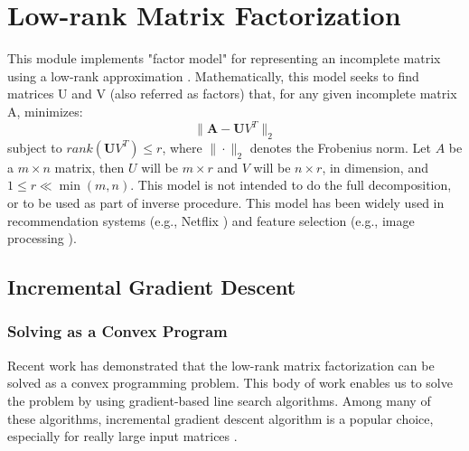 
\chapter{Low-rank Matrix Factorization}

This module implements "factor model" for representing an incomplete matrix using a low-rank approximation \cite{DBLP:conf/icml/SrebroJ03}.
Mathematically, this model seeks to find matrices U and V (also referred as factors) that, for any given incomplete matrix A, minimizes:
\[ \|\boldsymbol A - \boldsymbol UV^{T} \|_2 \]
subject to $rank(\boldsymbol UV^{T}) \leq r$, where $\|\cdot\|_2$ denotes the Frobenius norm.
Let $A$ be a $m \times n$ matrix, then $U$ will be $m \times r$ and $V$ will be $n \times r$, in dimension, and $1 \leq r \ll \min(m, n)$.
This model is not intended to do the full decomposition, or to be used as part of inverse procedure.
This model has been widely used in recommendation systems (e.g., Netflix \cite{:TheNetflixPrize07}) and feature selection (e.g., image processing \cite{DBLP:conf/nips/WrightGRPM09}).

\section{Incremental Gradient Descent}

\subsection{Solving as a Convex Program}
Recent work \cite{DBLP:journals/cacm/CandesR12, DBLP:journals/siamrev/RechtFP10} has demonstrated that the low-rank matrix factorization can be solved as a convex programming problem.
This body of work enables us to solve the problem by using gradient-based line search algorithms.
Among many of these algorithms, incremental gradient descent algorithm is a popular choice, especially for really large input matrices \cite{DBLP:conf/sigmod/FengKRR12, DBLP:conf/kdd/GemullaNHS11}.

